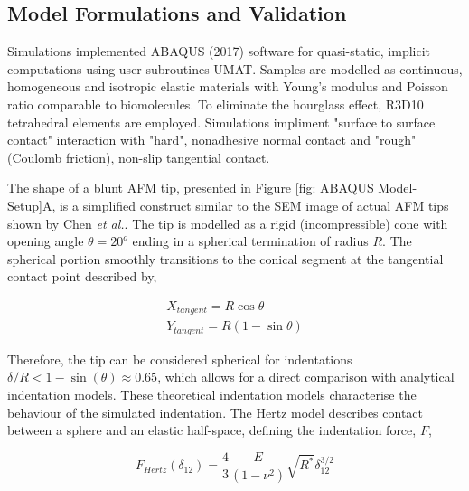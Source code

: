 \subsection{Model Formulations and Validation}
Simulations implemented ABAQUS (2017) software for quasi-static, implicit computations using user subroutines UMAT. Samples are modelled as continuous, homogeneous and isotropic elastic materials with Young's modulus and Poisson ratio comparable to biomolecules\cite{kurland2012measurement}. To eliminate the hourglass effect, R3D10 tetrahedral elements are employed\cite{hibbitt1984abaqus}.  Simulations impliment "surface to surface contact" interaction with "hard", nonadhesive normal contact and "rough" (Coulomb friction), non-slip tangential contact. 

The shape of a blunt AFM tip, presented in Figure \ref{fig: ABAQUS Model-Setup}A, is a simplified construct similar to the SEM image of actual AFM tips shown by Chen \textit{et al.}\cite{chen_luo_doudevski_erten_kim_2019}. The tip is modelled as a rigid (incompressible) cone with opening angle $\theta = 20^o$ ending in a spherical termination of radius $R$\cite{canet2014correction}. The spherical portion smoothly transitions to the conical segment at the tangential contact point described by,

\begin{equation}\label{eq: AFM Tip}
\begin{split}
    X_{tangent} = R\cos\theta 
    \\
    Y_{tangent} = R(1-\sin\theta) 
\end{split}
\end{equation}

Therefore, the tip can be considered spherical for indentations $\delta/R < 1-\sin(\theta) \approx 0.65$, which allows for a direct comparison with analytical indentation models. These theoretical indentation models characterise the behaviour of the simulated indentation. The Hertz model describes contact between a sphere and an elastic half-space, defining the indentation force, $F$\cite{hertz1881contact,hertz1882contact,hertz1896contact},

\begin{equation} F_{Hertz}(\delta_{12}) =  \frac{4}{3} \frac{E}{(1-\nu^2)} \sqrt{R^*} \delta_{12}^{3/2} \label{eq: Hertz} \end{equation}

